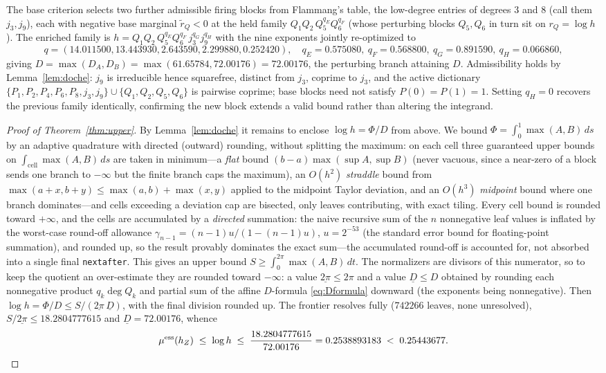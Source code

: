 \documentclass[11pt,reqno]{amsart}
\theoremstyle{plain}
\theoremstyle{definition}
\newcommand{\hZ}{h_Z}
\newcommand{\essmin}{\mu^{\mathrm{ess}}(\hZ)}
\newcommand{\rQ}{r_Q}
\newcommand{\dA}{D_A}
\newcommand{\dB}{D_B}
\begin{document}
The base criterion selects two further admissible firing blocks from Flammang's
\citep{F18} table, the low-degree entries of degrees $3$ and $8$ (call them $j_3,j_9$),
each with negative base marginal $\widetilde r_Q<0$ at the held family
$Q_1Q_2\,Q_5^{q_E}Q_6^{q_F}$ (whose perturbing blocks $Q_5,Q_6$ in turn sit on
$\rQ=\log h$). The enriched family is
$h=Q_1Q_2\,Q_5^{q_E}Q_6^{q_F}\,j_3^{q_G}j_9^{q_H}$ with the nine exponents jointly
re-optimized to
\[
  q=(14.011500,13.443930,2.643590,2.299880,0.252420),\quad
  q_E=0.575080,\ q_F=0.568800,\ q_G=0.891590,\ q_H=0.066860,
\]
giving $D=\max(\dA,\dB)=\max(61.65784,72.00176)=72.00176$, the perturbing branch
attaining $D$. Admissibility holds by Lemma~\ref{lem:doche}: $j_9$ is irreducible
hence squarefree, distinct from $j_3$, coprime to $j_3$, and the active dictionary
$\{P_1,P_2,P_4,P_6,P_8,j_3,j_9\}\cup\{Q_1,Q_2,Q_5,Q_6\}$ is pairwise coprime; base
blocks need not satisfy $P(0)=P(1)=1$. Setting $q_H=0$ recovers the previous family
identically, confirming the new block extends a valid bound rather than altering the
integrand.

\begin{proof}[Proof of Theorem~\ref{thm:upper}]
By Lemma~\ref{lem:doche} it remains to enclose $\log h=\Phi/D$ from above. We bound
$\Phi=\int_0^1\max(A,B)\,ds$ by an adaptive quadrature with directed (outward)
rounding, without splitting the maximum: on each cell three guaranteed upper bounds on
$\int_{\text{cell}}\max(A,B)\,ds$ are taken in minimum---a \emph{flat} bound
$(b-a)\max(\sup A,\sup B)$ (never vacuous, since a near-zero of a block sends one
branch to $-\infty$ but the finite branch caps the maximum), an $O(h^2)$
\emph{straddle} bound from $\max(a+x,b+y)\le\max(a,b)+\max(x,y)$ applied to the
midpoint Taylor deviation, and an $O(h^3)$ \emph{midpoint} bound where one branch
dominates---and cells exceeding a deviation cap are bisected, only leaves contributing,
with exact tiling. Every cell bound is rounded toward $+\infty$, and the cells are accumulated by a
\emph{directed} summation: the naive recursive sum of the $n$ nonnegative leaf values is
inflated by the worst-case round-off allowance $\gamma_{n-1}=(n-1)u/(1-(n-1)u)$, $u=2^{-53}$
(the standard error bound for floating-point summation), and rounded up, so the result
provably dominates the exact sum---the accumulated round-off is accounted for, not
absorbed into a single final \texttt{nextafter}. This gives an upper bound
$S\ge\int_0^{2\pi}\max(A,B)\,dt$. The normalizers are divisors of this numerator, so to
keep the quotient an over-estimate they are rounded toward $-\infty$: a value
$\underline{2\pi}\le2\pi$ and a value $\underline D\le D$ obtained by rounding each
nonnegative product $q_k\deg Q_k$ and partial sum of the affine $D$-formula
\eqref{eq:Dformula} downward (the exponents being nonnegative). Then
$\log h=\Phi/D\le S/(\underline{2\pi}\,\underline D)$, with the final division rounded up.
The frontier resolves fully ($742266$ leaves, none unresolved), $S/\underline{2\pi}\le
18.2804777615$ and $\underline D=72.00176$, whence
\[
  \essmin\;\le\;\log h\;\le\;\frac{18.2804777615}{72.00176}=0.2538893183\;<\;0.25443677. \qedhere
\]
\end{proof}
\end{document}
